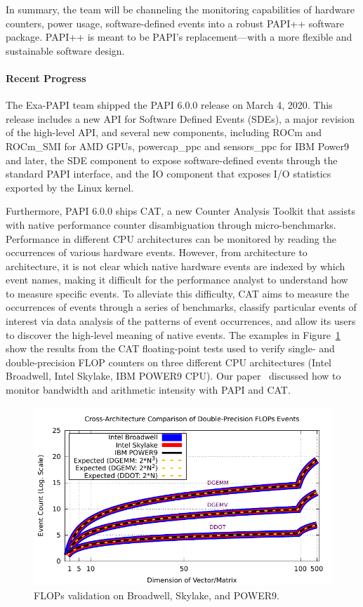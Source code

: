 In summary, the team will be channeling the monitoring capabilities of hardware 
counters, power usage, software-defined events into a robust PAPI++ software 
package. PAPI++ is meant to be PAPI's replacement---with a more flexible and 
sustainable software design.


\paragraph{Recent Progress}

The Exa-PAPI team shipped the PAPI 6.0.0 release on March 4, 2020. This release 
includes a new API for Software Defined Events (SDEs), a major revision of the 
high-level API, and several new components, including ROCm and ROCm\_{SMI} for AMD GPUs, 
powercap\_{ppc} and sensors\_{ppc} for IBM Power9 and later, the SDE component to expose 
software-defined events through the standard PAPI interface, and the IO component that 
exposes I/O statistics exported by the Linux kernel. 

\vspace{10pt}
Furthermore, PAPI 6.0.0 ships CAT, a new Counter Analysis Toolkit that assists with native 
performance counter disambiguation through micro-benchmarks. 
Performance in different CPU architectures can be monitored by reading the occurrences 
of various hardware events. However, from architecture to architecture, it is not clear which 
native hardware events are indexed by which event names, making it difficult for the 
performance analyst to understand how to measure specific events.
To alleviate this difficulty, CAT aims to measure the occurrences of events through a series 
of benchmarks, classify particular events of interest via data analysis of the patterns of 
event occurrences, and allow its users to discover the high-level meaning of native events.
%
The examples in Figure~\ref{fig:cat_flops} show the results from the CAT floating-point tests used to 
verify single- and double-precision FLOP counters on three different CPU architectures 
(Intel Broadwell, Intel Skylake, IBM POWER9 CPU). Our paper~\cite{toolsWS-2020-09} discussed 
how to monitor bandwidth and arithmetic intensity with PAPI and CAT.
%
\begin{figure}[!h]
\begin{center}
\includegraphics[width=0.7\linewidth]{projects/2.3.2-Tools/2.3.2.06-EXA-PAPI/cat-DP-flops-arch-comparison-1.pdf}
\caption{FLOPs validation on Broadwell, Skylake, and POWER9.}
\label{fig:cat_flops}
\end{center}
\end{figure}



